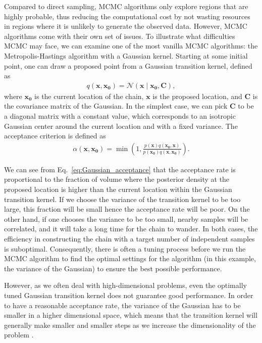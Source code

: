 \documentclass[twocolumn]{aastex631}
\begin{document}
Compared to direct sampling, MCMC algorithms only explore regions that are
highly probable, thus reducing the computational cost by not wasting resources
in regions where it is unlikely to generate the observed data. However, MCMC
algorithms come with their own set of issues. To illustrate what difficulties
MCMC may face, we can examine one of the most vanilla MCMC algorithms: the
Metropolis-Hastings algorithm with a Gaussian kernel. Starting at some initial
point, one can draw a proposed point from a Gaussian transition kernel, defined
as
\begin{align}
    q(\mathbf{x},\mathbf{x_0})= \mathcal{N}(\mathbf{x} \mid \mathbf{x_0},\mathbf{C}),
\end{align}
where $\mathbf{x_0}$ is the current location of the chain, $\mathbf{x}$ is the
proposed location, and $\mathbf{C}$ is the covariance matrix of the Gaussian. In
the simplest case, we can pick $\mathbf{C}$ to be a diagonal matrix with a
constant value, which corresponds to an isotropic Gaussian center around the
current location and with a fixed variance. The acceptance criterion is
defined as
\begin{align}
\alpha(\mathbf{x},\mathbf{x_0}) = \min\left(1,\frac{p(\mathbf{x})q(\mathbf{x_0},\mathbf{x})}{p(\mathbf{x_0})q(\mathbf{x},\mathbf{x_0})}\right).
\label{eq:Gaussian_acceptance}
\end{align}

We can see from Eq.~\eqref{eq:Gaussian_acceptance} that the acceptance rate is
proportional to the fraction of volume where the posterior density at the
proposed location is higher than the current location within the Gaussian
transition kernel. If we choose the variance of the transition kernel to be too
large, this fraction will be small hence the acceptance rate will be poor. On
the other hand, if one chooses the variance to be too small, nearby samples
will be correlated, and it will take a long time for the chain to wander. In
both cases, the efficiency in constructing the chain with a target number of
independent samples is suboptimal. Consequently, there is often a tuning
process before we run the MCMC algorithm to find the optimal settings for the
algorithm (in this example, the variance of the Gaussian) to ensure the best
possible performance.

However, as we often deal with high-dimensional problems, even the optimally
tuned Gaussian transition kernel does not guarantee good performance. In order
to have a reasonable acceptance rate, the variance of the Gaussian has to be
smaller in a higher dimensional space, which means that the transition kernel will generally make smaller and smaller steps as we increase the dimensionality of the problem
\cite{2017arXiv170102434B}.
\end{document}
